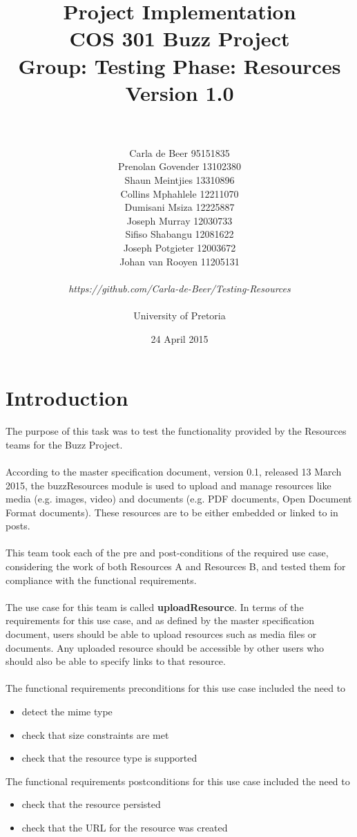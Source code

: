 \documentclass[a4paper]{article}
\title{Project Implementation
\\COS 301 Buzz Project
\\Group: Testing Phase: Resources
\\Version 1.0}
\author{
\\
\\Carla de Beer 95151835
\\Prenolan Govender 13102380
\\Shaun Meintjies 13310896
\\Collins Mphahlele 12211070
\\Dumisani Msiza 12225887
\\Joseph Murray 12030733
\\Sifiso Shabangu 12081622
\\Joseph Potgieter 12003672
\\Johan van Rooyen 11205131
\\
\\
\textit{https://github.com/Carla-de-Beer/Testing-Resources}
\\
\\ University of Pretoria}
\date{24 April 2015}
\begin{document}
\maketitle
\newpage


\tableofcontents
\newpage

\section{Introduction}

The purpose of this task was to test the functionality provided by the Resources teams for the Buzz Project.
\\
\\
According to the master specification document, version 0.1, released 13 March 2015, the buzzResources module is used to upload and manage resources like media (e.g. images, video) and documents (e.g. PDF documents, Open Document Format documents). These resources are to be either embedded or linked to in posts.
\\
\\
This team took each of the pre and post-conditions of the required use case, considering the work of both Resources A and Resources B, and tested them for compliance with the functional requirements. 
\\
\\The use case for this team is called \textbf{uploadResource}. In terms of the requirements for this use case, and as defined by the master specification document, users should be able to upload resources such as media files or documents. Any uploaded resource should be accessible by other users who should also be able to specify links to that resource. 
\\
\\The functional requirements preconditions for this use case included the need to
\begin{itemize}
\item detect the mime type
\item check that size constraints are met
\item check that the resource type is supported
\end{itemize}
The functional requirements postconditions for this use case included the need to
\begin{itemize}
\item check that the resource persisted
\item check that the URL for the resource was created
\end{itemize}
\end{document}
